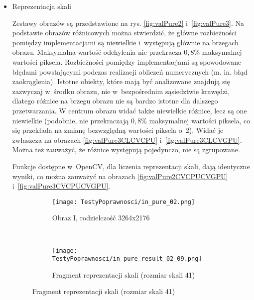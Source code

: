 \begin{itemize}

\newpage
\item{Reprezentacja skali}
\label{subsubsec:reprezentacjaSkaliRysunki}


Zestawy obrazów są przedstawione na rys. \ref{fig:valPure2} i~\ref{fig:valPure3}. Na podstawie obrazów różnicowych można stwierdzić, że główne rozbieżności pomiędzy implementacjami są niewielkie i~występują głównie na brzegach obrazu. Maksymalna wartość odchylenia nie przekracza $ 0,8\% $ maksymalnej wartości piksela. Rozbieżności pomiędzy implementacjami są spowodowane błędami powstającymi podczas realizacji obliczeń numerycznych (m. in. błąd zaokrąglenia). Istotne obiekty, które mają być analizowane znajdują się zazwyczaj w~środku obrazu, nie w~bezpośrednim sąsiedztwie krawędzi, dlatego różnice na brzegu obrazu nie są bardzo istotne dla dalszego przetwarzania. W centrum obrazu widać także niewielkie różnice, lecz są one niewielkie (podobnie, nie przekraczają $ 0,8\% $ maksymalnej wartości piksela, co się przekłada na zmianę bezwzględną wartości piksela o~2). Widać je zwłaszcza na obrazach \ref{fig:valPure3CLCVCPU} i~\ref{fig:valPure3CLCVGPU}. Można też zauważyć, że różnice występują pojedynczo, nie są zgrupowane.

Funkcje dostępne w~OpenCV, dla liczenia reprezentacji skali, dają identyczne wyniki, co można zauważyć na obrazach \ref{fig:valPure2CVCPUCVGPU} i~\ref{fig:valPure3CVCPUCVGPU}.

\begin{figure}[H]

\begin{center}
\begin{subfigure}[t]{0.3\textwidth}
\texttt{[image: TestyPoprawnosci/in\_pure\_02.png]}
\caption{Obraz I, rodzielczość 3264x2176}
\label{fig:valPure02}
\end{subfigure}
~
\begin{subfigure}[t]{0.3\textwidth}
\texttt{[image: TestyPoprawnosci/in\_pure\_result\_02\_09.png]}
\caption{Fragment reprezentacji skali (rozmiar skali 41)}
\label{fig:valPureResult02}
\end{subfigure}
\end{center}


\end{figure}
\end{itemize}
